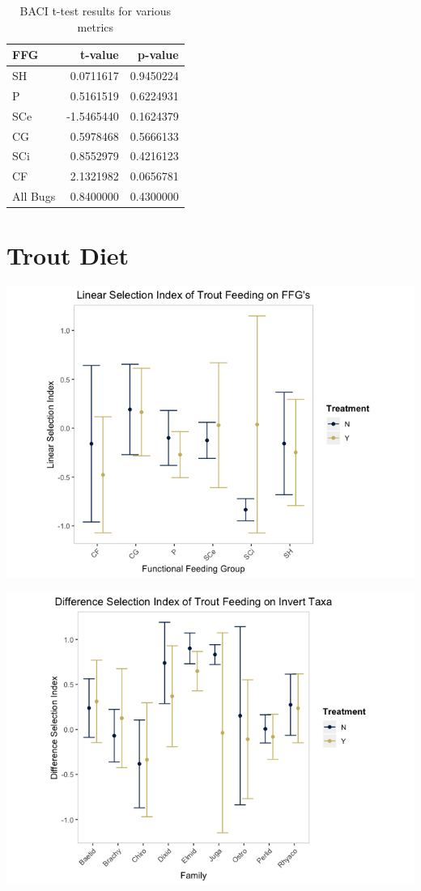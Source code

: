 \documentclass[double,12pt]{beavtex}
\begin{document}
  \begin{table}[t]
  
  \caption{\label{tab:ffgtable}BACI t-test results for various metrics}
  \centering
  \begin{tabular}{lrr}
  \toprule
  FFG & t-value & p-value\\
  \midrule
  SH & 0.0711617 & 0.9450224\\
  P & 0.5161519 & 0.6224931\\
  SCe & -1.5465440 & 0.1624379\\
  CG & 0.5978468 & 0.5666133\\
  SCi & 0.8552979 & 0.4216123\\
  \addlinespace
  CF & 2.1321982 & 0.0656781\\
  All Bugs & 0.8400000 & 0.4300000\\
  \bottomrule
  \end{tabular}
  \end{table}
  
  \section*{Trout Diet}\label{trout-diet}
  
  \begin{center}\includegraphics[width=0.6\linewidth]{Figures/Diet-FFG-D-1} \end{center}
  
  \begin{center}\includegraphics[width=0.6\linewidth]{Figures/Diet-Fam-D-1} \end{center}
  
\end{document}
